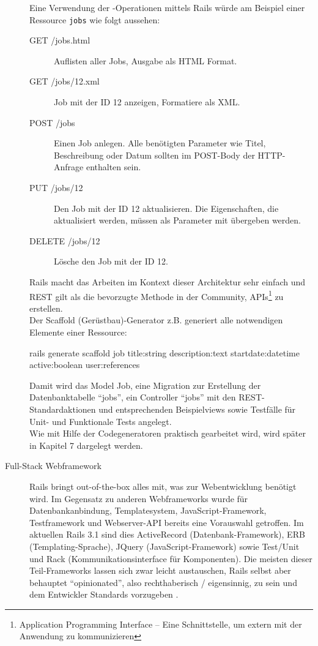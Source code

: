 \begin{description}
 Eine Verwendung der -Operationen mittels Rails würde am Beispiel einer Ressource \texttt{jobs} wie folgt aussehen:
  \begin{description}
  \item[GET /jobs.html] Auflisten aller Jobs, Ausgabe als HTML Format.
  \item[GET /jobs/12.xml] Job mit der ID 12 anzeigen, Formatiere als XML.
  \item[POST /jobs] Einen Job anlegen. Alle benötigten Parameter wie Titel, Beschreibung oder Datum sollten im POST-Body der HTTP-Anfrage enthalten sein.
  \item[PUT /jobs/12] Den Job mit der ID 12 aktualisieren. Die Eigenschaften, die aktualisiert werden, müssen als Parameter mit übergeben werden.
  \item[DELETE /jobs/12] Lösche den Job mit der ID 12.
  \end{description}
 Rails macht das Arbeiten im Kontext dieser Architektur sehr einfach und REST gilt als die bevorzugte Methode in der Community, APIs\footnote{Application Programming Interface --  Eine Schnittstelle, um extern mit der Anwendung zu kommunizieren} zu erstellen.
\\ Der Scaffold (Gerüstbau)-Generator z.B. generiert alle notwendigen Elemente einer Ressource:
\begin{ruby}[label=test/test\_feed.rb]
rails generate scaffold job title:string description:text 
  start\PYZus{}date:datetime active:boolean user:references
\end{ruby}
  Damit wird das Model Job, eine Migration zur Erstellung der Datenbanktabelle "`jobs"', ein Controller "`jobs"' mit den REST-Standardaktionen und entsprechenden Beispielviews sowie Testfälle für Unit- und Funktionale Tests angelegt. \\
  Wie mit Hilfe der Codegeneratoren praktisch gearbeitet wird, wird später in Kapitel 7 dargelegt werden.
 \item[Full-Stack Webframework] Rails bringt out-of-the-box alles mit, was zur Webentwicklung benötigt wird. Im Gegensatz zu anderen Webframeworks wurde für Datenbankanbindung, Templatesystem, JavaScript-Framework, Testframework und Webserver-API bereits eine Vorauswahl getroffen. Im aktuellen Rails 3.1 sind dies ActiveRecord (Datenbank-Framework), ERB (Templating-Sprache), JQuery (JavaScript-Framework) sowie Test/Unit und Rack (Kommunikationsinterface für Komponenten). Die meisten dieser Teil-Frameworks lassen sich zwar leicht austauschen, Rails selbst aber behauptet "`opinionated"', also rechthaberisch / eigensinnig, zu sein und dem Entwickler Standards vorzugeben \citep{david_heinemeier_hansson_railsconf_2011}.

\end{description}

